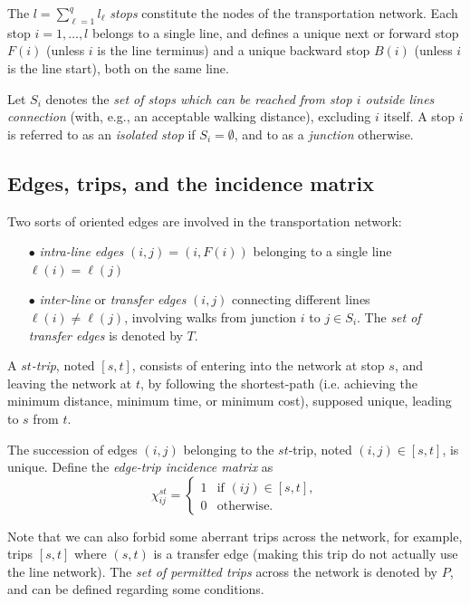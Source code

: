 \documentclass{bmcart}
\begin{document}
The $l=\sum_{\ell=1}^ql_\ell$ \emph{stops} constitute the nodes of the transportation network. Each stop $i=1,\ldots,l$ belongs to a single line, and defines a unique next or forward stop $F(i)$ (unless $i$ is the line terminus) and a unique backward stop $B(i)$ (unless $i$ is the line start), both on the same line.  

Let $S_i$ denotes the \emph{set of stops which can be reached from stop $i$ outside lines connection} (with, e.g., an acceptable walking distance), excluding $i$ itself. A stop $i$ is referred to as an \emph{isolated stop} if $S_i=\emptyset$, and to as a \emph{junction} otherwise. 

\subsection{Edges, trips, and the incidence matrix}
\label{Line edges, transfer edges and trips}

Two sorts of oriented edges are involved in the transportation network: 
\begin{enumerate}
  \item[$\bullet$] \emph{intra-line edges} $(i,j)=(i,F(i))$ belonging to a single line  $\ell(i)=\ell(j)$
  \item[$\bullet$] \emph{inter-line} or \emph{transfer edges} $(i,j)$ connecting different lines $\ell(i)\neq \ell(j)$, involving walks from junction $i$ to $j\in S_i$. The \emph{set of transfer edges} is denoted by $T$.
\end{enumerate}

A \emph{$st$-trip}, noted $[s,t]$, consists of entering into the network at stop $s$, and leaving the network at $t$, by following the shortest-path (i.e. achieving the minimum distance,  minimum time, or  minimum cost), supposed unique, leading to $s$ from $t$.

The succession of edges $(i, j)$ belonging to the $st$-trip, noted $(i,j)\in [s,t]$, is unique. Define the \emph{edge-trip incidence matrix} as
\begin{equation}
\label{edgetrip}
\chi_{ij}^{st} = \begin{cases}
  1    & \text{if $(ij)\in [s,t]$}, \\
  0    & \text{otherwise}.
\end{cases}
\end{equation}

Note that we can also forbid some aberrant trips across the network, for example, trips $[s, t]$ where $(s, t)$ is a transfer edge (making this trip do not actually use the line network). The \emph{set of permitted trips} across the network is denoted by $P$, and can be defined regarding some conditions.
\end{document}
